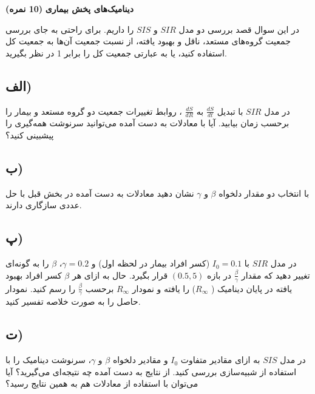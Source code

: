\Large \textbf{دینامیک‌های پخش بیماری}
\large \textbf{(10 نمره)}

\normalsize \vspace{0.5cm}
در این سوال قصد بررسی دو مدل 
$SIR$ و $SIS$ را داریم. برای راحتی به جای بررسی جمعیت گروه‌های مستعد، ناقل و بهبود یافته، از نسبت جمعیت آن‌ها به جمعیت کل استفاده کنید، یا به عبارتی جمعیت کل را برابر 1 در نظر بگیرید.
\subsection*{الف)}
در مدل 
$SIR$ 
با تبدیل 
$\frac{dS}{dt}$ به
$\frac{dS}{dR}$ ، روابط تغییرات جمعیت دو گروه مستعد و بیمار را برحسب زمان بیابید. آیا با معادلات به دست آمده می‌توانید سرنوشت همه‌گیری را پیشبینی کنید؟ 
\subsection*{ب)}
با انتخاب دو مقدار دلخواه 
$\beta$ و $\gamma$ نشان دهید معادلات به دست آمده در بخش قبل با حل عددی سازگاری دارند.

\subsection*{پ)}
در مدل 
$SIR$ 
با 
$I_0=0.1$ (کسر افراد بیمار در لحظه اول) و 
$\gamma=0.2$، 
$\beta$ را به گونه‌ای تغییر دهید که مقدار 
$\frac{\beta}{\gamma}$ در بازه 
$(0.5,5)$ قرار بگیرد. حال به ازای هر 
$\beta$ کسر افراد بهبود یافته در پایان دینامیک (
$R_{\infty}$) را یافته و نمودار 
$R_{\infty}$ برحسب 
$\frac{\beta}{\gamma}$ را رسم کنید. نمودار حاصل را به صورت خلاصه تفسیر کنید.
\subsection*{ت)}
در مدل 
$SIS$
به ازای مقادیر متفاوت 
$I_0$ و مقادیر دلخواه
$\beta$ و $\gamma$، سرنوشت دینامیک را با استفاده از شبیه‌سازی بررسی کنید. از 
نتایج به دست آمده چه نتیجه‌ای می‌گیرید؟
آیا می‌توان با استفاده از معادلات هم به همین نتایج رسید؟
